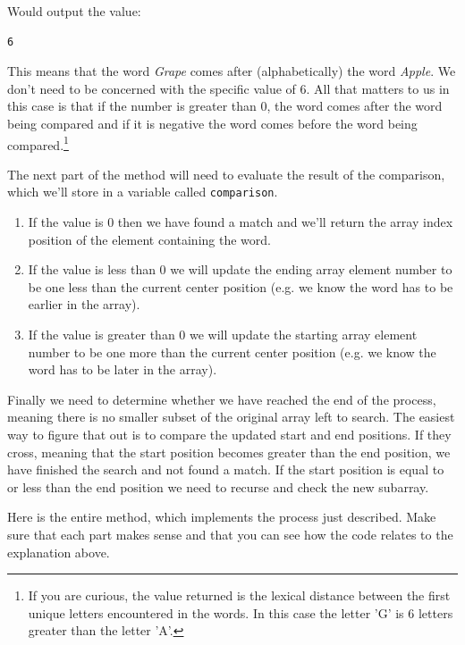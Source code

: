 Would output the value:

\beforeverb
\begin{verbatim}
6
\end{verbatim}
\afterverb

This means that the word \textit{Grape} comes after (alphabetically) the word \textit{Apple}. We don't need to be concerned with the specific value of 6. All that matters to us in this case is that if the number is greater than 0, the word comes after the word being compared and if it is negative the word comes before the word being compared.\footnote{If you are curious, the value returned is the lexical distance between the first unique letters encountered in the words. In this case the letter 'G' is 6 letters greater than the letter 'A'.}

The next part of the method will need to evaluate the result of the comparison, which we'll store in a variable called \texttt{comparison}. 

\begin{enumerate}
	\item If the value is 0 then we have found a match and we'll return the array index position of the element containing the word. 
	\item If the value is less than 0 we will update the ending array element number to be one less than the current center position (e.g. we know the word has to be earlier in the array).
	\item If the value is greater than 0 we will update the starting array element number to be one more than the current center position (e.g. we know the word has to be later in the array).
\end{enumerate}

Finally we need to determine whether we have reached the end of the process, meaning there is no smaller subset of the original array left to search. The easiest way to figure that out is to compare the updated start and end positions. If they cross, meaning that the start position becomes greater than the end position, we have finished the search and not found a match. If the start position is equal to or less than the end position we need to recurse and check the new subarray.

Here is the entire method, which implements the process just described. Make sure that each part makes sense and that you can see how the code relates to the explanation above.

